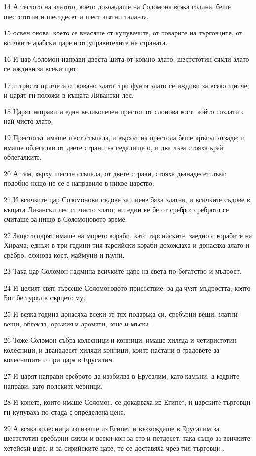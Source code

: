 \par 14 А теглото на златото, което дохождаше на Соломона всяка година, беше шестстотин и шестдесет и шест златни таланта,
\par 15 освен онова, което се внасяше от купувачите, от товарите на търговците, от всичките арабски царе и от управителите на страната.
\par 16 И цар Соломон направи двеста щита от ковано злато; шестстотин сикли злато се иждиви за всеки щит:
\par 17 и триста щитчета от ковано злато; три фунта злато се иждиви за всяко щитче; и царят ги положи в къщата Ливански лес.
\par 18 Царят направи и един великолепен престол от слонова кост, който позлати с най-чисто злато.
\par 19 Престолът имаше шест стъпала, и върхът на престола беше кръгъл отзаде; и имаше облегалки от двете страни на седалището, и два лъва стояха край облегалките.
\par 20 А там, върху шестте стъпала, от двете страни, стояха дванадесет лъва; подобно нещо не се е направило в никое царство.
\par 21 И всичките цар Соломонови съдове за пиене бяха златни, и всичките съдове в къщата Ливански лес от чисто злато; ни един не бе от сребро; среброто се считаше за нищо в Соломоновото време.
\par 22 Защото царят имаше на морето кораби, като тарсийските, заедно с корабите на Хирама; еднъж в три години тия тарсийски кораби дохождаха и донасяха злато и сребро, слонова кост, маймуни и пауни.
\par 23 Така цар Соломон надмина всичките царе на света по богатство и мъдрост.
\par 24 И целият свят търсеше Соломоновото присъствие, за да чуят мъдростта, която Бог бе турил в сърцето му.
\par 25 И всяка година донасяха всеки от тях подаръка си, сребърни вещи, златни вещи, облекла, оръжия и аромати, коне и мъски.
\par 26 Тоже Соломон събра колесници и конници; имаше хиляда и четиристотин колесници, и дванадесет хиляди конници, които настани в градовете за колесниците и при царя в Ерусалим.
\par 27 И царят направи среброто да изобилва в Ерусалим, като камъни, а кедрите направи, като полските черници.
\par 28 И конете, които имаше Соломон, се докарваха из Египет; и царските търговци ги купуваха по стада с определена цена.
\par 29 А всяка колесница излизаше из Египет и възхождаше в Ерусалим за шестстотин сребърни сикли и всеки кон за сто и петдесет; така също за всичките хетейски царе, и за сирийските царе, те се доставяха чрез тия търговци .

